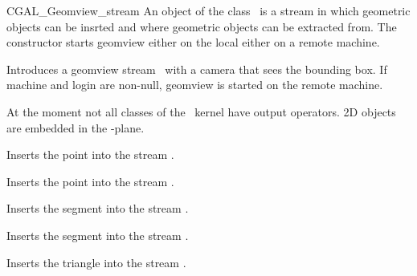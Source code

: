 \begin{ccClass}{CGAL_Geomview_stream}
\ccDefinition
An object of the class \ccClassName\ is a stream in which geometric
objects can be insrted and where geometric objects can be extracted
from. The constructor starts geomview either on the local either on
a remote machine.


\ccThreeToTwo
\ccCreation
{}

{Introduces a geomview stream \ccVar\ with a camera that sees the
bounding box. If machine and login are non-null, geomview is started
on the remote machine.}



\ccOperations



At the moment not all classes of the \cgal\ kernel have output
operators. 2D objects are embedded in the -plane.

{Inserts the point  into the stream \ccVar.}


{Inserts the point  into the stream \ccVar.}


{Inserts the segment  into the stream \ccVar.}

{Inserts the segment  into the stream \ccVar.}


{Inserts the triangle  into the stream \ccVar.}



\end{ccClass}
